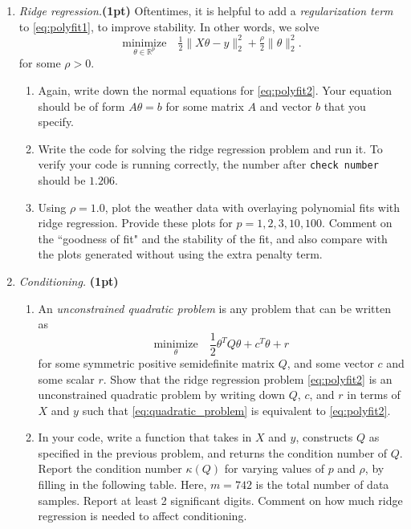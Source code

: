 \documentclass{article}
\newcommand{\minimize}[1]{\underset{#1}{\text{minimize}}}
\newcommand{\showpoints}[1]{\textbf{(#1)}}
\begin{document}
\begin{enumerate}
\begin{enumerate}
\begin{enumerate}
\end{enumerate}
\item \emph{Ridge regression.}\showpoints{1pt}   Oftentimes, it is helpful to add a \emph{regularization term} to \eqref{eq:polyfit1}, to improve stability.  In other words, we solve 
\begin{equation}
\underset{\theta\in \mathbb R^p} {\text{minimize}}\quad \tfrac{1}{2}\|X\theta - y\|_2^2 + \tfrac{\rho}{2} \|\theta\|_2^2.
\label{eq:polyfit2}
\end{equation}
for some $\rho > 0$. 
\begin{enumerate}
\item Again, write down the normal equations for \eqref{eq:polyfit2}. Your equation should be of form $A\theta =b$ for some matrix $A$ and vector $b$ that you specify.





\item Write the code for solving the ridge regression problem and run it. To verify your code is running correctly, the number after \texttt{check number} should be   $1.206$.

\item  Using $\rho = 1.0$,  plot the weather data with overlaying polynomial fits with ridge regression. Provide these plots for $p = 1,2,3,10,100$. Comment on the ``goodness of fit" and the stability of the fit, and also compare with the plots generated without using the extra penalty term. 


\end{enumerate}

\item \emph{Conditioning.} \showpoints{1pt} 
\begin{enumerate}
\item An \emph{unconstrained quadratic problem} is any problem that can be written as
\begin{equation}
\minimize{\theta}\quad \frac{1}{2}\theta^TQ\theta + c^T\theta + r
\label{eq:quadratic_problem}
\end{equation}
for some symmetric positive semidefinite matrix $Q$, and some vector $c$ and some scalar $r$. Show that the ridge regression problem \eqref{eq:polyfit2} is an unconstrained quadratic problem by writing down $Q$, $c$, and $r$ in terms of $X$ and $y$ such that
\eqref{eq:quadratic_problem} is equivalent to \eqref{eq:polyfit2}.


\item In your code, write a function that takes in $X$ and $y$, constructs $Q$ as specified in the previous problem, and  returns the condition number of $Q$. Report the condition number $\kappa(Q)$ for varying values of $p$ and $\rho$, by filling in the following table. 
Here, $m = 742$ is the total number of data samples. Report at least 2 significant digits.
Comment on how much ridge regression is needed to affect conditioning.


\end{enumerate}
\end{enumerate}
\end{enumerate}
\end{document}
